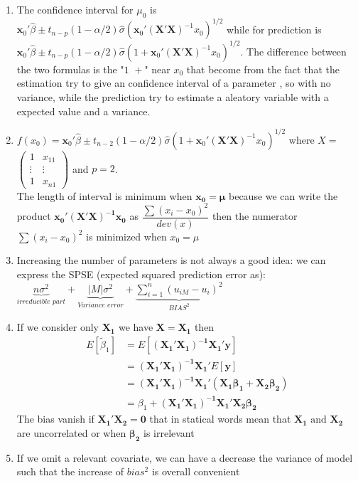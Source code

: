 \documentclass[10pt,a4paper]{article}
\begin{document}
\begin{enumerate}
		\item The confidence interval for $ \mu_0  $ is $ \mathbf{x}_0' \hat{\beta} \pm t_{n-p}(1-\alpha / 2) \hat{\sigma} (\mathbf{x}_0' (\mathbf{X'X})^{-1} x_0)^{1/2}$ while for prediction is $ \mathbf{x}_0' \hat{\beta} \pm t_{n-p}(1-\alpha / 2) \hat{\sigma} (1 + \mathbf{x}_0' (\mathbf{X'X})^{-1} x_0)^{1/2}$. The difference between the two formulas is the "$ 1\,\,+ $" near $ x_0 $ that become from the fact that the estimation try to give an confidence interval of a parameter , so with no variance, while the prediction try to estimate a aleatory variable with a expected value and a variance.
		\item $ f(x_0) = \mathbf{x}_0' \hat{\beta} \pm t_{n-2}(1-\alpha / 2) \hat{\sigma} (1 + \mathbf{x}_0' (\mathbf{X'X})^{-1} x_0)^{1/2}$
		where $ X = $
		$ \left( \begin{matrix}
			1 & x_{11} \\ 
			\vdots & \vdots  \\ 
		1 & x_{n1}
			\end{matrix} \right)$ and $ p = 2 $.\\
			The length of interval is minimum when $ \mathbf{x_0 = \mu}  $ because we can write the product $ \mathbf{x_0'(X'X)^{-1}x_0}  $ as $ \dfrac{\sum(x_i - x_0)^2}{dev(x)} $ then the numerator $  \sum(x_i - x_0)^2 $ is minimized when $ x_0 = \mu $
			\item Increasing the number of parameters is not always a good idea: we can express the SPSE (expected squared prediction error as):
			$ \underbrace{n\sigma^2}_{irreducible\,\,  part} + \underbrace{|M|\sigma^2}_{Variance \,\, error} + \underbrace{\sum_{i=1}^{n} (u_{i M} - u_i)^2}_{BIAS^2} $
			\item If we consider only $ \mathbf{X_1} $ we have $ \mathbf{X = X_1} $ then 
			\begin{align*}
				E\left[ \tilde{\beta}_1 \right]		&= E \left[ \mathbf{(X_1'X_1)^{-1} X_1'y} \right] \\
				&=  \mathbf{(X_1'X_1)^{-1} X_1' } E \left[ \mathbf{y} \right] \\
				&=  \mathbf{(X_1'X_1)^{-1} X_1' (X_1 \beta_1 + X_2 \beta_2)} \\
				&= \beta_1 +\mathbf{(X_1'X_1)^{-1} X_1'  X_2 \beta_2}
			\end{align*}
			The bias vanish if $ \mathbf{X_1'  X_2  = 0} $ that in statical words mean that $ \mathbf{X_1} \text{ and } \mathbf{X_2} $ are uncorrelated or when $ \mathbf{\beta_2}  $ is irrelevant
			\item If we omit a relevant covariate, we can have a decrease the variance of model such that the increase of $ bias^2 $ is overall convenient

\end{enumerate}
\end{document}
